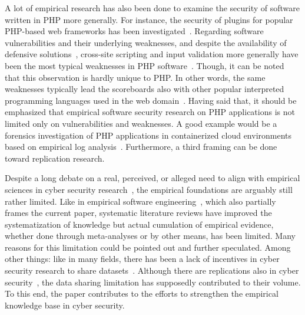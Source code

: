 \documentclass[5p, twocolumn, numbers, sort]{elsarticle}
\begin{document}
A lot of empirical research has also been done to examine the security of
software written in PHP more generally. For instance, the security of plugins
for popular PHP-based web frameworks has been investigated~\cite{Niemietz21,
  Ruohonen19EASE}. Regarding software vulnerabilities and their underlying
weaknesses, and despite the availability of defensive solutions~\cite{Dahse15},
cross-site scripting and input validation more generally have been the most
typical weaknesses in PHP software~\cite{Ruohonen19EASE, Santos17}. Though, it
can be noted that this observation is hardly unique to PHP. In other words, the
same weaknesses typically lead the scoreboards also with other popular
interpreted programming languages used in the web
domain~\cite{Ruohonen18IWESEP}. Having said that, it should be emphasized that
empirical software security research on PHP applications is not limited only on
vulnerabilities and weaknesses. A good example would be a forensics
investigation of PHP applications in containerized cloud environments based on
empirical log analysis~\cite{Hyder24}. Furthermore, a third framing can be done
toward replication research.

Despite a long debate on a real, perceived, or alleged need to align with
empirical sciences in cyber security research~\cite{Herley17}, the empirical
foundations are arguably still rather limited. Like in empirical software
engineering~\cite{Shepperd13}, which also partially frames the current paper,
systematic literature reviews have improved the systematization of knowledge but
actual cumulation of empirical evidence, whether done through meta-analyses or
by other means, has been limited. Many reasons for this limitation could be
pointed out and further speculated. Among other things: like in many fields,
there has been a lack of incentives in cyber security research to share
datasets~\cite{Zheng18}. Although there are replications also in cyber
security~\cite{Ruohonen15COSE}, the data sharing limitation has supposedly
contributed to their volume. To this end, the paper contributes to the efforts
to strengthen the empirical knowledge base in cyber security.
\end{document}
